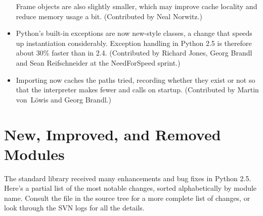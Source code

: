 \documentclass{howto}
\begin{document}
\begin{itemize}
Frame objects are also slightly smaller, which may improve cache locality
and reduce memory usage a bit.  (Contributed by Neal Norwitz.)

\item Python's built-in exceptions are now new-style classes, a change
that speeds up instantiation considerably.  Exception handling in
Python 2.5 is therefore about 30\% faster than in 2.4.
(Contributed by Richard Jones, Georg Brandl and Sean Reifschneider at
the NeedForSpeed sprint.)

\item Importing now caches the paths tried, recording whether 
they exist or not so that the interpreter makes fewer 
 and  calls on startup.
(Contributed by Martin von~L\"owis and Georg Brandl.)

\end{itemize}


\section{New, Improved, and Removed Modules\label{modules}}

The standard library received many enhancements and bug fixes in
Python 2.5.  Here's a partial list of the most notable changes, sorted
alphabetically by module name. Consult the  file in
the source tree for a more complete list of changes, or look through
the SVN logs for all the details.
\end{document}
